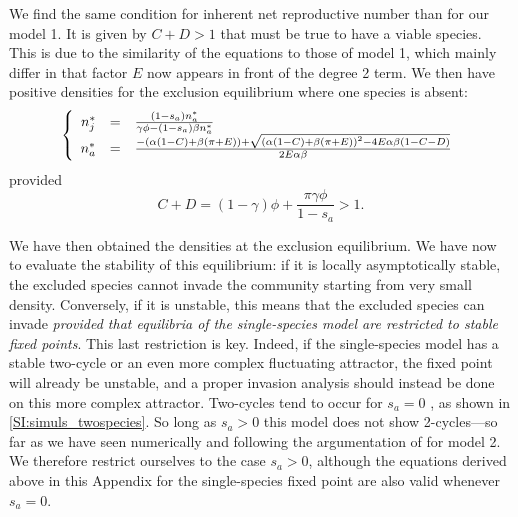\documentclass{article}
\begin{document}
We find the same condition for inherent net reproductive number than for our model 1. It is given by $C+D >1$ that must be true to have a viable species. This is due to the similarity of the equations to those of model 1, which mainly differ in that factor $E$ now appears in front of the degree 2 term. We then have positive densities for the exclusion equilibrium where one species is absent:
\begin{equation}
    \left\{
\begin{array}{r c l}
n_j^* &=&  \frac{(1-s_a)n_a^*}{\gamma\phi - (1-s_a)\beta n_a^*}\\
n_a^* &=& \frac{-\left(\alpha(1-C) +\beta(\pi+E)\right)+\sqrt{\left(\alpha(1-C) +\beta(\pi+E)\right)^2-4E\alpha\beta(1-C-D)}}{2E\alpha\beta}
\end{array}
\right.
\end{equation}
provided 
\begin{equation}
   C+D = (1-\gamma)\phi +\frac{\pi \gamma \phi}{1-s_a} > 1. 
\end{equation}

We have then obtained the densities at the exclusion equilibrium. We have now to evaluate the stability of this equilibrium: if it is locally asymptotically stable, the excluded species cannot invade the community starting from very small density. Conversely, if it is unstable, this means that the excluded species can invade \textit{provided that equilibria of the single-species model are restricted to stable fixed points}. This last restriction is key. Indeed, if the single-species model has a stable two-cycle or an even more complex fluctuating attractor, the fixed point will already be unstable, and a proper invasion analysis should instead be done on this more complex attractor. Two-cycles tend to occur for $s_a=0$ \citep{cushing2007coexistence}, as shown in \ref{SI:simuls_twospecies}. So long as $s_a>0$ this model does not show 2-cycles---so far as we have seen numerically and following the argumentation of \citet{cushing2007coexistence} for model 2. We therefore restrict ourselves to the case $s_a>0$, although the equations derived above in this Appendix for the single-species fixed point are also valid whenever $s_a=0$.
\end{document}
